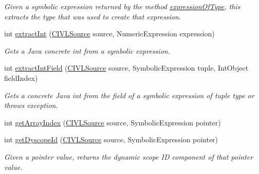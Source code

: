 \begin{DoxyCompactItemize}
\begin{DoxyCompactList}\small\item\em Given a symbolic expression returned by the method \hyperlink{interfaceedu_1_1udel_1_1cis_1_1vsl_1_1civl_1_1dynamic_1_1IF_1_1SymbolicUtility_a9d79c66017bf3533f5545ecdce61f1b8}{expression\+Of\+Type}, this extracts the type that was used to create that expression. \end{DoxyCompactList}\item 
int \hyperlink{interfaceedu_1_1udel_1_1cis_1_1vsl_1_1civl_1_1dynamic_1_1IF_1_1SymbolicUtility_ac6b651468219e3d2e997c3b35d022cd4}{extract\+Int} (\hyperlink{interfaceedu_1_1udel_1_1cis_1_1vsl_1_1civl_1_1model_1_1IF_1_1CIVLSource}{C\+I\+V\+L\+Source} source, Numeric\+Expression expression)
\begin{DoxyCompactList}\small\item\em Gets a Java concrete int from a symbolic expression. \end{DoxyCompactList}\item 
int \hyperlink{interfaceedu_1_1udel_1_1cis_1_1vsl_1_1civl_1_1dynamic_1_1IF_1_1SymbolicUtility_ad521b2245cc408621c89c701fb779f17}{extract\+Int\+Field} (\hyperlink{interfaceedu_1_1udel_1_1cis_1_1vsl_1_1civl_1_1model_1_1IF_1_1CIVLSource}{C\+I\+V\+L\+Source} source, Symbolic\+Expression tuple, Int\+Object field\+Index)
\begin{DoxyCompactList}\small\item\em Gets a concrete Java int from the field of a symbolic expression of tuple type or throws exception. \end{DoxyCompactList}\item 
int \hyperlink{interfaceedu_1_1udel_1_1cis_1_1vsl_1_1civl_1_1dynamic_1_1IF_1_1SymbolicUtility_aa73866f72afaf0babce24d2abe74dcd8}{get\+Array\+Index} (\hyperlink{interfaceedu_1_1udel_1_1cis_1_1vsl_1_1civl_1_1model_1_1IF_1_1CIVLSource}{C\+I\+V\+L\+Source} source, Symbolic\+Expression pointer)
\item 
int \hyperlink{interfaceedu_1_1udel_1_1cis_1_1vsl_1_1civl_1_1dynamic_1_1IF_1_1SymbolicUtility_a18322dfd95bf364c6226760a743f46b9}{get\+Dyscope\+Id} (\hyperlink{interfaceedu_1_1udel_1_1cis_1_1vsl_1_1civl_1_1model_1_1IF_1_1CIVLSource}{C\+I\+V\+L\+Source} source, Symbolic\+Expression pointer)
\begin{DoxyCompactList}\small\item\em Given a pointer value, returns the dynamic scope I\+D component of that pointer value. \end{DoxyCompactList}\item 

\end{DoxyCompactItemize}
